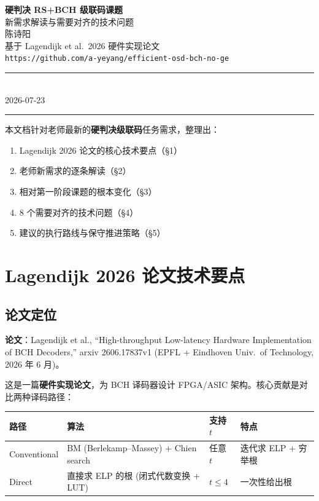 \documentclass[11pt,a4paper]{article}
\begin{document}
\begin{center}
{\Large\bfseries 硬判决 RS+BCH 级联码课题}\\[4pt]
{\large 新需求解读与需要对齐的技术问题}\\[16pt]
{\normalsize 陈诗阳\\
基于 Lagendijk et al.\ 2026 硬件实现论文\\
\vspace{2pt}
\texttt{https://github.com/a-yeyang/efficient-osd-bch-no-ge}}\\[10pt]
\rule{0.9\textwidth}{0.4pt}\\[6pt]
{\footnotesize 2026-07-23}\\
\rule{0.9\textwidth}{0.4pt}
\end{center}

\vspace{6pt}
\begin{keybox}[title=\textbf{文档目的}]
本文档针对老师最新的\textbf{硬判决级联码}任务需求，整理出：
\begin{enumerate}[leftmargin=1.5em, itemsep=1pt, topsep=2pt]
\item Lagendijk 2026 论文的核心技术要点（\S1）
\item 老师新需求的逐条解读（\S2）
\item 相对第一阶段课题的根本变化（\S3）
\item 8 个需要对齐的技术问题（\S4）
\item 建议的执行路线与保守推进策略（\S5）
\end{enumerate}
\end{keybox}

\section{Lagendijk 2026 论文技术要点}

\subsection{论文定位}

\textbf{论文}：Lagendijk et al., ``High-throughput Low-latency Hardware Implementation of BCH Decoders,''
arxiv 2606.17837v1 (EPFL + Eindhoven Univ.\ of Technology, 2026 年 6 月)。

这是一篇\textbf{硬件实现论文}，为 BCH 译码器设计 FPGA/ASIC 架构。核心贡献是对比两种译码路径：

\begin{table}[!ht]
\centering
\begin{tabularx}{\textwidth}{lXXX}
\toprule
\textbf{路径} & \textbf{算法} & \textbf{支持} $t$ & \textbf{特点} \\
\midrule
Conventional & BM (Berlekamp--Massey) + Chien search & 任意 $t$ & 迭代求 ELP + 穷举根 \\
Direct       & 直接求 ELP 的根 (闭式代数变换 + LUT) & $t \le 4$ & 一次性给出根 \\
\bottomrule
\end{tabularx}
\end{table}
\end{document}
